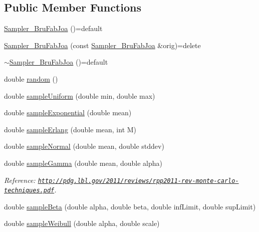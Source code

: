 \subsection*{Public Member Functions}
\begin{DoxyCompactItemize}
\item 
\hyperlink{class_sampler___bru_fab_joa_ac5c1b07d30e0bc71cbd649d7309bc8d5}{Sampler\-\_\-\-Bru\-Fab\-Joa} ()=default
\item 
\hyperlink{class_sampler___bru_fab_joa_a7160ab6a7a00e69c22a4eb0b840b5cb9}{Sampler\-\_\-\-Bru\-Fab\-Joa} (const \hyperlink{class_sampler___bru_fab_joa}{Sampler\-\_\-\-Bru\-Fab\-Joa} \&orig)=delete
\item 
\hyperlink{class_sampler___bru_fab_joa_a1ce52dacb81a5175b217ec218941a77c}{$\sim$\-Sampler\-\_\-\-Bru\-Fab\-Joa} ()=default
\item 
double \hyperlink{class_sampler___bru_fab_joa_a0345255356e072f0a1b938227d272ac8}{random} ()
\item 
double \hyperlink{class_sampler___bru_fab_joa_a7f75268eabd66fad415e794a3eda6261}{sample\-Uniform} (double min, double max)
\item 
double \hyperlink{class_sampler___bru_fab_joa_a4335f6cabcaabb35e9819733e136633e}{sample\-Exponential} (double mean)
\item 
double \hyperlink{class_sampler___bru_fab_joa_a4d6967d5b31138b7e4d91eeb04ecb5d4}{sample\-Erlang} (double mean, int M)
\item 
double \hyperlink{class_sampler___bru_fab_joa_af2ceb8fb7083313d1fc11943c6e74cef}{sample\-Normal} (double mean, double stddev)
\item 
double \hyperlink{class_sampler___bru_fab_joa_a153a0271be4644e81ddce07a5516632d}{sample\-Gamma} (double mean, double alpha)
\begin{DoxyCompactList}\small\item\em Reference\-: \href{http://pdg.lbl.gov/2011/reviews/rpp2011-rev-monte-carlo-techniques.pdf}{\tt http\-://pdg.\-lbl.\-gov/2011/reviews/rpp2011-\/rev-\/monte-\/carlo-\/techniques.\-pdf}. \end{DoxyCompactList}\item 
double \hyperlink{class_sampler___bru_fab_joa_ade1272ea2e4cf1011f3ad3449db90181}{sample\-Beta} (double alpha, double beta, double inf\-Limit, double sup\-Limit)
\item 
double \hyperlink{class_sampler___bru_fab_joa_a164e1ee8bb1e2c3e8a36f8154623c068}{sample\-Weibull} (double alpha, double scale)
\item 

\end{DoxyCompactItemize}
